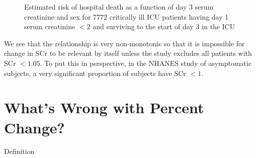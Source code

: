 \begin{Schunk}
\begin{figure}[htbp]
\caption[Hospital death as a function of creatinine]{Estimated risk of hospital death as a function of day 3 serum creatinine and sex for 7772 critically ill ICU patients having day 1 serum creatinine $< 2$ and surviving to the start of day 3 in the ICU}\label{fig:change-suppcr}
\end{figure}
\end{Schunk}
We see that the relationship is very non-monotonic so that it is
impossible for change in SCr to be relevant by itself unless the study
excludes all patients with SCr $< 1.05$.  To put this in perspective,
in the NHANES study of asymptomatic subjects, a very significant
proportion of subjects have SCr $< 1$.


\section{What's Wrong with Percent Change?}
\bi
\item   Definition

